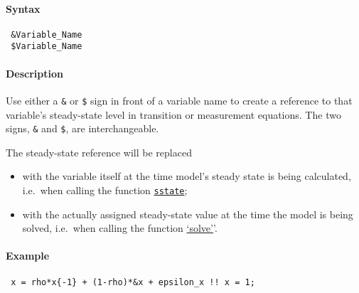 


	\paragraph{Syntax}
 
 \begin{verbatim}
 &Variable_Name
 $Variable_Name
 \end{verbatim}
 
 \paragraph{Description}
 
 Use either a \texttt{\&} or \texttt{\$} sign in front of a variable name
 to create a reference to that variable's steady-state level in
 transition or measurement equations. The two signs, \texttt{\&} and
 \texttt{\$}, are interchangeable.
 
 The steady-state reference will be replaced
 
 \begin{itemize}
 \item
   with the variable itself at the time model's steady state is being
   calculated, i.e.~when calling the function
   \href{model/sstate}{\texttt{sstate}};
 \item
   with the actually assigned steady-state value at the time the model is
   being solved, i.e.~when calling the function
   \href{model/solve}{`solve'}'.
 \end{itemize}
 
 \paragraph{Example}
 
 \begin{verbatim}
 x = rho*x{-1} + (1-rho)*&x + epsilon_x !! x = 1;
 \end{verbatim}


